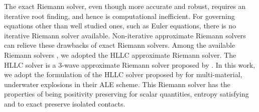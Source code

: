The exact Riemann solver, even though more accurate and robust, requires an iterative root finding, and hence is computational inefficient. For governing equations other than well studied ones, such as Euler equations, there is no iterative Riemann solver available. Non-iterative approximate Riemann solvers can relieve these drawbacks of exact Riemann solvers. Among the available Riemann solvers \citep{rider1994review, luo2004computation, puri2014approximate}, we adopted the HLLC approximate Riemann solver.
The HLLC solver is a 3-wave approximate Riemann solver proposed by \citet{toro1994restoration}. In this work, we adopt the formulation of the HLLC solver proposed by \citet{luo2004computation} for multi-material, underwater explosions in their ALE scheme. This Riemann solver has the properties of being positivity preserving for scalar quantities, entropy satisfying and to exact preserve isolated contacts.

